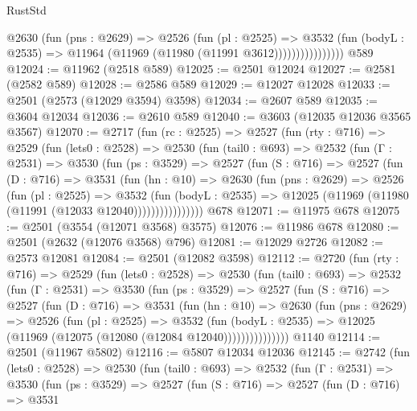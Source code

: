 \begin{lexlean}{RustStd}
\begin{coremodule}
{\begin{coremodule}
{{{{{{{{{{{{{{{{{{{{                      @2630
                        (fun (pns : @2629) =>
                        @2526
                          (fun (pl : @2525) =>
                          @3532
                            (fun (bodyL : @2535) =>
                            @11964 (@11969 (@11980 (@11991 @3612))))))))))))))))
    @589
@12024 := @11962 (@2518 @589)
@12025 := @2501 @12024
@12027 := @2581 (@2582 @589)
@12028 := @2586 @589
@12029 := @12027 @12028
@12033 := @2501 (@2573 (@12029 @3594) @3598)
@12034 := @2607 @589
@12035 := @3604 @12034
@12036 := @2610 @589
@12040 := @3603 (@12035 @12036 @3565 @3567)
@12070 := @2717
    (fun (rc : @2525) =>
    @2527
      (fun (rty : @716) =>
      @2529
        (fun (lets0 : @2528) =>
        @2530
          (fun (tail0 : @693) =>
          @2532
            (fun (Γ : @2531) =>
            @3530
              (fun (ps : @3529) =>
              @2527
                (fun (S : @716) =>
                @2527
                  (fun (D : @716) =>
                  @3531
                    (fun (hn : @10) =>
                    @2630
                      (fun (pns : @2629) =>
                      @2526
                        (fun (pl : @2525) =>
                        @3532
                          (fun (bodyL : @2535) =>
                          @12025 (@11969 (@11980 (@11991 (@12033 @12040))))))))))))))))
    @678
@12071 := @11975 @678
@12075 := @2501 (@3554 (@12071 @3568) @3575)
@12076 := @11986 @678
@12080 := @2501 (@2632 (@12076 @3568) @796)
@12081 := @12029 @2726
@12082 := @2573 @12081
@12084 := @2501 (@12082 @3598)
@12112 := @2720
    (fun (rty : @716) =>
    @2529
      (fun (lets0 : @2528) =>
      @2530
        (fun (tail0 : @693) =>
        @2532
          (fun (Γ : @2531) =>
          @3530
            (fun (ps : @3529) =>
            @2527
              (fun (S : @716) =>
              @2527
                (fun (D : @716) =>
                @3531
                  (fun (hn : @10) =>
                  @2630
                    (fun (pns : @2629) =>
                    @2526
                      (fun (pl : @2525) =>
                      @3532
                        (fun (bodyL : @2535) =>
                        @12025 (@11969 (@12075 (@12080 (@12084 @12040)))))))))))))))
    @1140
@12114 := @2501 (@11967 @5802)
@12116 := @5807 @12034 @12036
@12145 := @2742
    (fun (lets0 : @2528) =>
    @2530
      (fun (tail0 : @693) =>
      @2532
        (fun (Γ : @2531) =>
        @3530
          (fun (ps : @3529) =>
          @2527
            (fun (S : @716) =>
            @2527
              (fun (D : @716) =>
              @3531
}}}}}}}}}}}}}}}}}}}}
\end{coremodule}}
\end{coremodule}
\end{lexlean}
